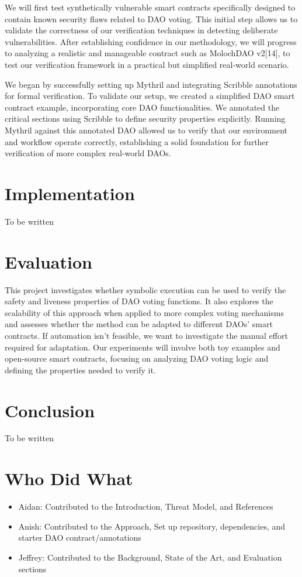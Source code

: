 \documentclass[conference]{IEEEtran}
\begin{document}
We will first test synthetically vulnerable smart contracts specifically designed to contain known security flaws related to DAO voting. This initial step allows us to validate the correctness of our verification techniques in detecting deliberate vulnerabilities. After establishing confidence in our methodology, we will progress to analyzing a realistic and manageable contract such as MolochDAO v2[14], to test our verification framework in a practical but simplified real-world scenario.

We began by successfully setting up Mythril and integrating Scribble annotations for formal verification. To validate our setup, we created a simplified DAO smart contract example, incorporating core DAO functionalities. We annotated the critical sections using Scribble to define security properties explicitly. Running Mythril against this annotated DAO allowed us to verify that our environment and workflow operate correctly, establishing a solid foundation for further verification of more complex real-world DAOs.

\section{Implementation}
To be written


\section{Evaluation}

This project investigates whether symbolic execution can be used to verify the safety and liveness properties of DAO voting functions. It also explores the scalability of this approach when applied to more complex voting mechanisms and assesses whether the method can be adapted to different DAOs' smart contracts. If automation isn't feasible, we want to investigate the manual effort required for adaptation. Our experiments will involve both toy examples and open-source smart contracts, focusing on analyzing DAO voting logic and defining the properties needed to verify it.

\section{Conclusion}
To be written

\section{Who Did What}
\begin{itemize}
    \item Aidan: Contributed to the Introduction, Threat Model, and References
    \item Anish: Contributed to the Approach, Set up repository, dependencies, and starter DAO contract/annotations
    \item Jeffrey: Contributed to the Background, State of the Art, and Evaluation sections
\end{itemize}
\end{document}
